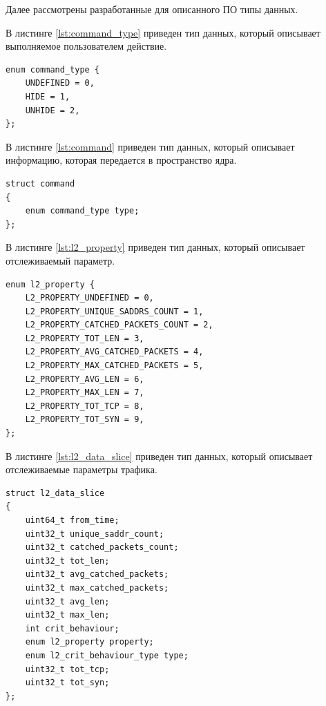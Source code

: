 \documentclass{bmstu}
\begin{document}
Далее рассмотрены разработанные для описанного ПО типы данных.

В листинге \ref{lst:command_type} приведен тип данных, который описывает выполняемое пользователем действие.
\begin{lstlisting}[caption = {command\_type}, label=lst:command_type]
enum command_type {
    UNDEFINED = 0,
    HIDE = 1,
    UNHIDE = 2,
};
\end{lstlisting}

В листинге \ref{lst:command} приведен тип данных, который описывает информацию, которая передается в пространство ядра.
\begin{lstlisting}[caption = {command}, label=lst:command]
struct command
{
    enum command_type type;
};
\end{lstlisting}

В листинге \ref{lst:l2_property} приведен тип данных, который описывает отслеживаемый параметр.
\begin{lstlisting}[caption = {l2\_property}, label=lst:l2_property]
enum l2_property {
    L2_PROPERTY_UNDEFINED = 0,
    L2_PROPERTY_UNIQUE_SADDRS_COUNT = 1,
    L2_PROPERTY_CATCHED_PACKETS_COUNT = 2,
    L2_PROPERTY_TOT_LEN = 3,
    L2_PROPERTY_AVG_CATCHED_PACKETS = 4,
    L2_PROPERTY_MAX_CATCHED_PACKETS = 5,
    L2_PROPERTY_AVG_LEN = 6,
    L2_PROPERTY_MAX_LEN = 7,
    L2_PROPERTY_TOT_TCP = 8,
    L2_PROPERTY_TOT_SYN = 9,
};
\end{lstlisting}


В листинге \ref{lst:l2_data_slice} приведен тип данных, который описывает отслеживаемые параметры трафика.
\begin{lstlisting}[caption = {l2\_data\_slice}, label=lst:l2_data_slice]
struct l2_data_slice
{
    uint64_t from_time;
    uint32_t unique_saddr_count;
    uint32_t catched_packets_count;
    uint32_t tot_len;
    uint32_t avg_catched_packets;
    uint32_t max_catched_packets;
    uint32_t avg_len;
    uint32_t max_len;
    int crit_behaviour;
    enum l2_property property;
    enum l2_crit_behaviour_type type;
    uint32_t tot_tcp;
    uint32_t tot_syn;
};
\end{lstlisting}
\end{document}

